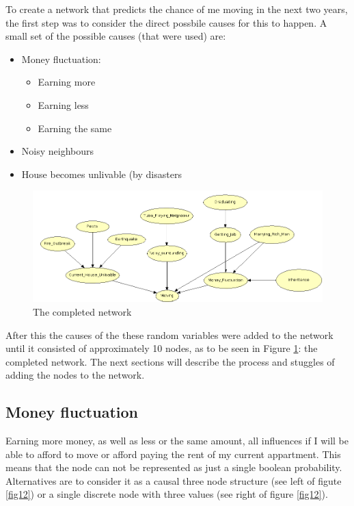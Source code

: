 \documentclass[12pt]{article} %
\begin{document}
To create a network that predicts the chance of me moving in the next two years,
the first step was to consider the  direct possbile causes for this to happen. A
small set of the possible causes (that were used) are:

\begin{itemize}
    \item Money fluctuation:
        \begin{itemize}
            \item Earning more
            \item Earning less
            \item Earning the same
        \end{itemize}
    \item Noisy neighbours
    \item House becomes unlivable (by disasters 
\end{itemize}


\begin{figure}[h!]
    \centering
    \includegraphics[width=1\textwidth]{network3}
    \caption{The completed network}
    \label{ref:complete}
\end{figure}
After this the causes of the these random variables were added to the network
until it consisted of approximately 10 nodes, as to be seen in
Figure \ref{ref:complete}: the completed network. The next sections will describe the
process and stuggles of adding the nodes to the network.


\subsection{Money fluctuation} %
Earning more money, as well as
less or the same amount, all influences if I will be able to afford to move or
afford paying the rent of my current appartment. This means that the node
can not be represented as just a single boolean probability. Alternatives are
to consider it as a causal three node structure (see left of figute
\ref{fig12}) or a single discrete node with three values (see right of figure \ref{fig12}).
\end{document}

